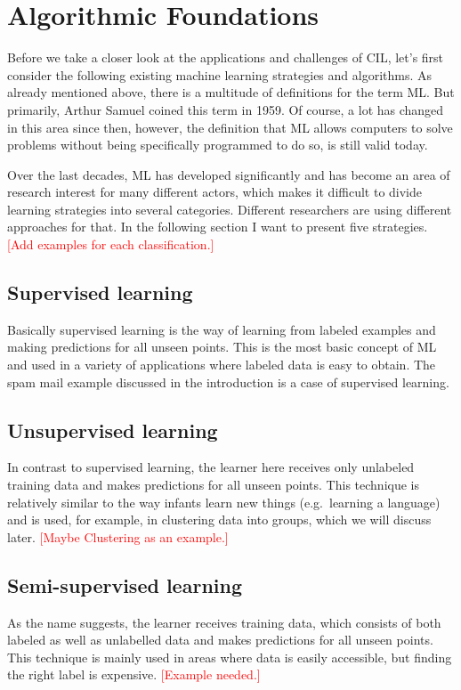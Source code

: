\documentclass[conference]{IEEEtran}
\newcommand\notes[1]{\textcolor{red}{#1}}
\begin{document}
\section{Algorithmic Foundations}
Before we take a closer look at the applications and challenges of CIL, let's first consider the 
following existing machine learning strategies and algorithms. As already mentioned above, 
there is a multitude of definitions for the term ML\@. But primarily, Arthur Samuel 
coined this term in 1959. Of course, a lot has changed in this area since then, 
however, the definition that ML allows computers to solve problems without being 
specifically programmed to do so, is still valid today\cite{MLStudiesUsingCheckers:samuel}.

Over the last decades, ML has developed significantly and has become an area of
research interest for many different actors, which makes it difficult to divide learning 
strategies into several categories. Different researchers are using different approaches 
for that\cite{FoundationsOfML:mohri}\cite{Structure:corne}. 
In the following section I want to present five strategies\cite{FoundationsOfML:mohri}.
\notes{[Add examples for each classification.]}

\subsection{Supervised learning}
Basically supervised learning is the way of learning from labeled examples and making predictions 
for all unseen points. This is the most basic concept of ML and used in a variety of applications 
where labeled data is easy to obtain. The spam mail example discussed in the introduction is a 
case of supervised learning.

\subsection{Unsupervised learning}
In contrast to supervised learning, the learner here receives only 
unlabeled training data and makes predictions for all unseen points. This technique is 
relatively similar to the way infants learn new things (e.g.\ learning a language) and 
is used, for example, in clustering data into groups, which we will discuss later\cite{BrainInf:holzinger}.
\notes{[Maybe Clustering as an example.]}

\subsection{Semi-supervised learning}
As the name suggests, the learner receives training data, which consists of both 
labeled as well as unlabelled data and makes predictions for all unseen points.
This technique is mainly used in areas where data is easily accessible, 
but finding the right label is expensive.
\notes{[Example needed.]}
\end{document}
